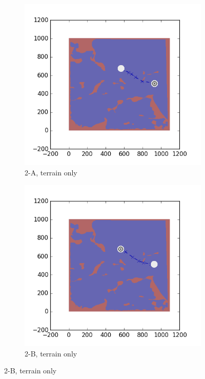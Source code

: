 \documentclass{tamuccthesis}
\begin{document}
\begin{figure}[H]
    \centering
    \begin{subfigure}[b]{0.35\textwidth}
        \centering
        \includegraphics[width=\textwidth,trim={4cm 3cm 2cm 3cm},clip]{EXP3RG_PathBa_-1_-1_0_0.png}
        \caption{\small{2-A, terrain only}}
        \label{fig:Path_2-A_terrain}
    \end{subfigure}
    \hfill
    \begin{subfigure}[b]{0.35\textwidth}  
        \centering 
        \includegraphics[width=\textwidth,trim={4cm 3cm 2cm 3cm},clip]{EXP3RG_PathBb_-1_-1_0_0.png}
        \caption{\small{2-B, terrain only}}
        \label{fig:Path_2-B_terrain}
    \end{subfigure}
    

\end{figure}
\end{document}
